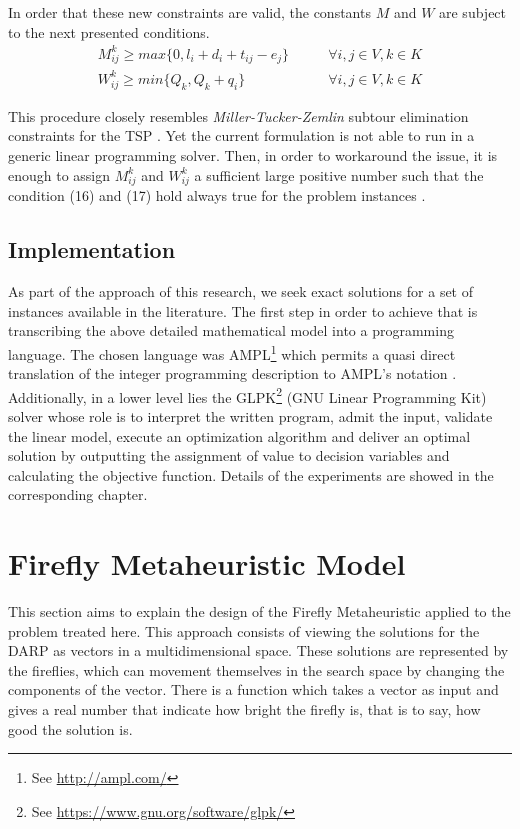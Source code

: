 \documentclass[tuberlin,cic,tc,openright,english,noabntcite,oneside]{iiufrgs}
\begin{document}
In order that these new constraints are valid, the constants $M$ and $W$ are subject to the next presented conditions.
\begin{align}
	M_{ij}^k \geq max\{0, l_i+d_i+t_{ij} - e_j\}	\qquad & \forall i,j \in V, k \in K \\
	W_{ij}^k \geq min\{Q_k, Q_k+q_i\}				\qquad & \forall i,j \in V, k \in K
\end{align}

This procedure closely resembles \emph{Miller-Tucker-Zemlin} subtour elimination constraints for the TSP \parencite[p. 575]{cordeau_branch-and-cut_2006}. Yet the current formulation is not able to run in a generic linear programming solver. Then, in order to workaround the issue, it is enough to assign $M_{ij}^k$ and $W_{ij}^k$ a sufficient large positive number such that the condition (16) and (17) hold always true for the problem instances \parencite[p. 44]{hall_integrated_2009}.

\subsection{Implementation}
As part of the approach of this research, we seek exact solutions for a set of instances available in the literature. The first step in order to achieve that is transcribing the above detailed mathematical model into a programming language. The chosen language was AMPL\footnote{See \url{http://ampl.com/}} which permits a quasi direct translation of the integer programming description to AMPL's notation \parencite[p. 520]{fourer_modeling_1990}. Additionally, in a lower level lies the GLPK\footnote{See \url{https://www.gnu.org/software/glpk/}} (GNU Linear Programming Kit) solver whose role is to interpret the written program, admit the input, validate the linear model, execute an optimization algorithm and deliver an optimal solution by outputting the assignment of value to decision variables and calculating the objective function. Details of the experiments are showed in the corresponding chapter.

\section{Firefly Metaheuristic Model}
This section aims to explain the design of the Firefly Metaheuristic applied to the problem treated here. This approach consists of viewing the solutions for the DARP as vectors in a multidimensional space. These solutions are represented by the fireflies, which can movement themselves in the search space by changing the components of the vector. There is a function which takes a vector as input and gives a real number that indicate how bright the firefly is, that is to say, how good the solution is.
\end{document}
